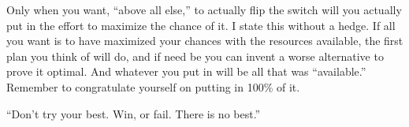 Only when you want, ``above all else,'' to actually flip the switch will you actually put in the effort to maximize the chance of it. I state this without a hedge. If all you want is to have maximized your chances with the resources available, the first plan you think of will do, and if need be you can invent a worse alternative to prove it optimal. And whatever you put in will be all that was ``available.'' Remember to congratulate yourself on putting in 100\% of it.

``Don't try your best. Win, or fail. There is no best.'' 
